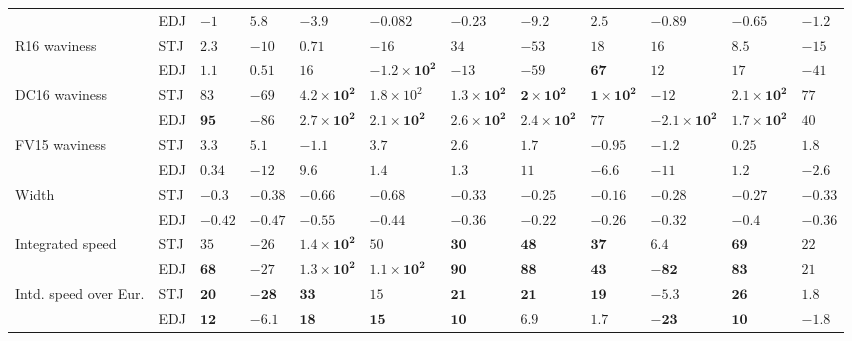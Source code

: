 \begin{tabular}{l}
 & EDJ & ${-1}$ & ${5.8}$ & ${-3.9}$ & ${-0.082}$ & ${-0.23}$ & $\mathbf{-9.2}$ & ${2.5}$ & ${-0.89}$ & ${-0.65}$ & ${-1.2}$ \\
R16 waviness & STJ & ${2.3}$ & ${-10}$ & ${0.71}$ & ${-16}$ & ${34}$ & ${-53}$ & ${18}$ & ${16}$ & ${8.5}$ & ${-15}$ \\
 & EDJ & ${1.1}$ & ${0.51}$ & ${16}$ & $\mathbf{-1.2 \times 10^{2}}$ & ${-13}$ & ${-59}$ & $\mathbf{67}$ & ${12}$ & ${17}$ & ${-41}$ \\
DC16 waviness & STJ & ${83}$ & ${-69}$ & $\mathbf{4.2 \times 10^{2}}$ & ${1.8 \times 10^{2}}$ & $\mathbf{1.3 \times 10^{2}}$ & $\mathbf{2 \times 10^{2}}$ & $\mathbf{1 \times 10^{2}}$ & ${-12}$ & $\mathbf{2.1 \times 10^{2}}$ & ${77}$ \\
 & EDJ & $\mathbf{95}$ & ${-86}$ & $\mathbf{2.7 \times 10^{2}}$ & $\mathbf{2.1 \times 10^{2}}$ & $\mathbf{2.6 \times 10^{2}}$ & $\mathbf{2.4 \times 10^{2}}$ & ${77}$ & $\mathbf{-2.1 \times 10^{2}}$ & $\mathbf{1.7 \times 10^{2}}$ & ${40}$ \\
FV15 waviness & STJ & ${3.3}$ & ${5.1}$ & ${-1.1}$ & ${3.7}$ & ${2.6}$ & ${1.7}$ & ${-0.95}$ & ${-1.2}$ & ${0.25}$ & ${1.8}$ \\
 & EDJ & ${0.34}$ & ${-12}$ & $\mathbf{9.6}$ & ${1.4}$ & ${1.3}$ & ${11}$ & ${-6.6}$ & ${-11}$ & ${1.2}$ & ${-2.6}$ \\
Width & STJ & ${-0.3}$ & ${-0.38}$ & $\mathbf{-0.66}$ & $\mathbf{-0.68}$ & $\mathbf{-0.33}$ & ${-0.25}$ & ${-0.16}$ & ${-0.28}$ & $\mathbf{-0.27}$ & $\mathbf{-0.33}$ \\
 & EDJ & $\mathbf{-0.42}$ & ${-0.47}$ & $\mathbf{-0.55}$ & ${-0.44}$ & $\mathbf{-0.36}$ & ${-0.22}$ & ${-0.26}$ & ${-0.32}$ & $\mathbf{-0.4}$ & $\mathbf{-0.36}$ \\
Integrated speed & STJ & ${35}$ & ${-26}$ & $\mathbf{1.4 \times 10^{2}}$ & ${50}$ & $\mathbf{30}$ & $\mathbf{48}$ & $\mathbf{37}$ & ${6.4}$ & $\mathbf{69}$ & ${22}$ \\
 & EDJ & $\mathbf{68}$ & ${-27}$ & $\mathbf{1.3 \times 10^{2}}$ & $\mathbf{1.1 \times 10^{2}}$ & $\mathbf{90}$ & $\mathbf{88}$ & $\mathbf{43}$ & $\mathbf{-82}$ & $\mathbf{83}$ & ${21}$ \\
Intd. speed over Eur. & STJ & $\mathbf{20}$ & $\mathbf{-28}$ & $\mathbf{33}$ & ${15}$ & $\mathbf{21}$ & $\mathbf{21}$ & $\mathbf{19}$ & ${-5.3}$ & $\mathbf{26}$ & ${1.8}$ \\
 & EDJ & $\mathbf{12}$ & ${-6.1}$ & $\mathbf{18}$ & $\mathbf{15}$ & $\mathbf{10}$ & ${6.9}$ & ${1.7}$ & $\mathbf{-23}$ & $\mathbf{10}$ & ${-1.8}$ \\

\end{tabular}
